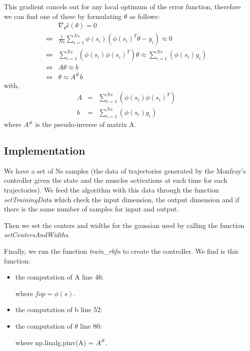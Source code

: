 \documentclass[pdftex,a4paper,11pt]{report}
\begin{document}
This gradient cancels out for any local optimum of the error function, therefore we can find one of these by formulating $\theta$ as follows:
\begin{eqnarray}
 & \nabla_\theta\hat{\epsilon}(\theta) = 0 \nonumber \\
\Leftrightarrow & \frac{1}{Ns}\sum\limits_{i=1}^{Ns}\phi(s_i)(\phi(s_i)^T\mathbb{\theta} - y_i) \approx 0 \nonumber \\
\Leftrightarrow & \sum\limits_{i=1}^{Ns}(\phi(s_i)\phi(s_i)^T)\mathbb{\theta} \approx \sum\limits_{i=1}^{Ns}(\phi(s_i)y_i) \nonumber \\
\Leftrightarrow & A\mathbb{\theta} \approx b \nonumber \\
\Leftrightarrow & \mathbb{\theta} \approx A^\#b \nonumber
\end{eqnarray}
with,
\begin{eqnarray}
A & = & \sum\limits_{i=1}^{Ns}(\phi(s_i)\phi(s_i)^T) \\
b & = & \sum\limits_{i=1}^{Ns}(\phi(s_i)y_i)
\end{eqnarray}
where $A^\#$ is the pseudo-inverse of matrix A.

\subsection{Implementation}
We have a set of Ns samples (the data of trajectories generated by the Monfray's controller given the state and the muscles activations at each time for each trajectories). We feed the algorithm with this data through the function \textit{setTrainingData} which check the input dimension, the output dimension and if there is the same number of samples for input and output.

Then we set the centers and widths for the gaussian used by calling the function \textit{setCentersAndWidths}.

Finally, we run the function \textit{train\_rbfn} to create the controller. We find is this function:
\begin{itemize}
\item the computation of A line 46:

where $fop = \phi(s)$.
\item the computation of b line 52:

\item the computation of $\theta$ line 80:

where np.linalg.pinv(A) = $A^\#$.
\end{itemize}
 
\end{document}

